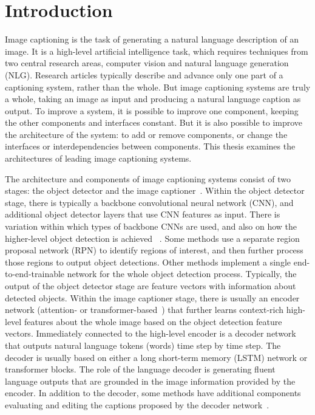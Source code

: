 \documentclass[english,twoside,openright]{HYgraduMLDS}
\begin{document}
\mytableofcontents

\mynomenclature


\chapter{Introduction}
\label{chapter:intro}
Image captioning is the task of generating a natural language description of an image. It is a high-level artificial intelligence task, which requires techniques from two central research areas, computer vision and natural language generation (NLG). Research articles typically describe and advance only one part of a captioning system, rather than the whole. But image captioning systems are truly a whole, taking an image as input and producing a natural language caption as output. To improve a system, it is possible to improve one component, keeping the other components and interfaces constant. But it is also possible to improve the architecture of the system: to add or remove components, or change the interfaces or interdependencies between components. This thesis examines the architectures of leading image captioning systems.

The architecture and components of image captioning systems consist of two stages: the object detector and the image captioner~\cite{SurveyDL}. Within the object detector stage, there is typically a backbone convolutional neural network (CNN), and additional object detector layers that use CNN features as input. There is variation within which types of backbone CNNs are used, and also on how the higher-level object detection is achieved ~\cite{FasterRCNN, BottomUp, SurveyDL}. Some methods use a separate region proposal network (RPN) to identify regions of interest, and then further process those regions to output object detections. Other methods implement a single end-to-end-trainable network for the whole object detection process. Typically, the output of the object detector stage are feature vectors with information about detected objects. Within the image captioner stage, there is usually an encoder network (attention- or transformer-based~\cite{Attention}) that further learns context-rich high-level features about the whole image based on the object detection feature vectors. Immediately connected to the high-level encoder is a decoder network that outputs natural language tokens (words) time step by time step. The decoder is usually based on either a long short-term memory (LSTM) network or transformer blocks. The role of the language decoder is generating fluent language outputs that are grounded in the image information provided by the encoder. In addition to the decoder, some methods have additional components evaluating and editing the captions proposed by the decoder network~\cite{ShowEdit}.
\end{document}
